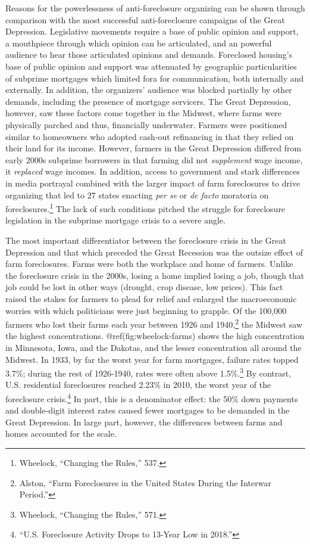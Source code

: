 \documentclass[
]{article}
\let\rmarkdownfootnote\footnote%
\def\footnote{\protect\rmarkdownfootnote}
\begin{document}
Reasons for the powerlessness of anti-foreclosure organizing can be
shown through comparison with the most successful anti-foreclosure
campaigns of the Great Depression. Legislative movements require a base
of public opinion and support, a mouthpiece through which opinion can be
articulated, and an powerful audience to hear those articulated opinions
and demands. Foreclosed housing's base of public opinion and support was
attenuated by geographic particularities of subprime mortgages which
limited fora for communication, both internally and externally. In
addition, the organizers' audience was blocked partially by other
demands, including the presence of mortgage servicers. The Great
Depression, however, saw these factors come together in the Midwest,
where farms were physically parched and thus, financially underwater.
Farmers were positioned similar to homeowners who adopted cash-out
refinancing in that they relied on their land for its income. However,
farmers in the Great Depression differed from early 2000s subprime
borrowers in that farming did not \emph{supplement} wage income, it
\emph{replaced} wage incomes. In addition, access to government and
stark differences in media portrayal combined with the larger impact of
farm foreclosures to drive organizing that led to 27 states enacting
\emph{per se} or \emph{de facto} moratoria on foreclosures.\footnote{Wheelock,
  ``Changing the Rules,'' 537.} The lack of such conditions pitched the
struggle for foreclosure legislation in the subprime mortgage crisis to
a severe angle.

The most important differentiator between the foreclosure crisis in the
Great Depression and that which preceded the Great Recession was the
outsize effect of farm foreclosures. Farms were both the workplace and
home of farmers. Unlike the foreclosure crisis in the 2000s, losing a
home implied losing a job, though that job could be lost in other ways
(drought, crop disease, low prices). This fact raised the stakes for
farmers to plead for relief and enlarged the macroeconomic worries with
which politicians were just beginning to grapple. Of the 100,000 farmers
who lost their farms each year between 1926 and 1940,\footnote{Alston,
  ``Farm Foreclosures in the United States During the Interwar Period.''}
the Midwest saw the highest concentrations. @ref(fig:wheelock-farms)
shows the high concentration in Minnesota, Iowa, and the Dakotas, and
the lesser concentration all around the Midwest. In 1933, by far the
worst year for farm mortgages, failure rates topped 3.7\%; during the
rest of 1926-1940, rates were often above 1.5\%.\footnote{Wheelock,
  ``Changing the Rules,'' 571.} By contrast, U.S. residential
foreclosures reached 2.23\% in 2010, the worst year of the foreclosure
crisis.\footnote{``U.S. Foreclosure Activity Drops to 13-Year Low in
  2018.''} In part, this is a denominator effect: the 50\% down payments
and double-digit interest rates caused fewer mortgages to be demanded in
the Great Depression. In large part, however, the differences between
farms and homes accounted for the scale.
\end{document}
